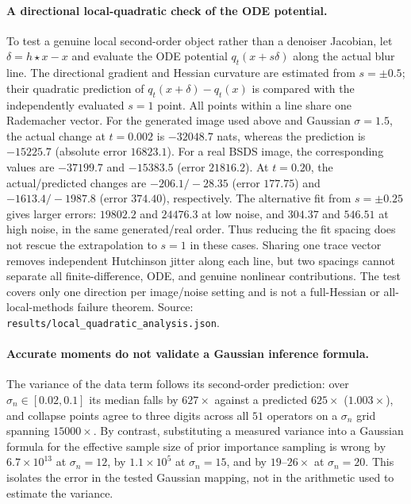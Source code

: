 \documentclass[10pt,journal]{IEEEtran}
\newcommand{\blur}{\star}
\begin{document}
\paragraph*{A directional local-quadratic check of the ODE potential.}
To test a genuine local second-order object rather than a denoiser Jacobian, let
$\delta=h\blur x-x$ and evaluate the ODE potential $q_t(x+s\delta)$ along the actual blur line.
The directional gradient and Hessian curvature are estimated from $s=\pm0.5$; their quadratic
prediction of $q_t(x+\delta)-q_t(x)$ is compared with the independently evaluated $s=1$ point.
All points within a line share one Rademacher vector. For the generated image used above and
Gaussian $\sigma=1.5$, the actual change at $t=0.002$ is $-32048.7$ nats, whereas the prediction
is $-15225.7$ (absolute error $16823.1$). For a real BSDS image, the corresponding values are
$-37199.7$ and $-15383.5$ (error $21816.2$). At $t=0.20$, the actual/predicted changes are
$-206.1/-28.35$ (error $177.75$) and $-1613.4/-1987.8$ (error $374.40$), respectively. The
alternative fit from $s=\pm0.25$ gives larger errors: $19802.2$ and $24476.3$ at low noise,
and $304.37$ and $546.51$ at high noise, in the same generated/real order. Thus reducing the
fit spacing does not rescue the extrapolation to $s=1$ in these cases. Sharing one trace vector
removes independent Hutchinson jitter along each line, but two spacings cannot separate all
finite-difference, ODE, and genuine nonlinear contributions. The test covers only one direction
per image/noise setting and is not a full-Hessian or all-local-methods failure theorem. Source:
\texttt{results/local\_quadratic\_analysis.json}.

\paragraph*{Accurate moments do not validate a Gaussian inference formula.}
The variance of the data term follows its second-order prediction: over
$\sigma_n\in[0.02,0.1]$ its median falls by $627\times$ against a predicted $625\times$
($1.003\times$), and collapse points agree to three digits across all $51$ operators on a
$\sigma_n$ grid spanning $15000\times$. By contrast, substituting a measured variance into a
Gaussian formula for the effective sample size of prior importance sampling is wrong by
$6.7\times10^{13}$ at $\sigma_n=12$, by $1.1\times10^{5}$ at $\sigma_n=15$, and by
$19$--$26\times$ at $\sigma_n=20$. This isolates the error in the tested Gaussian mapping,
not in the arithmetic used to estimate the variance.
\end{document}
